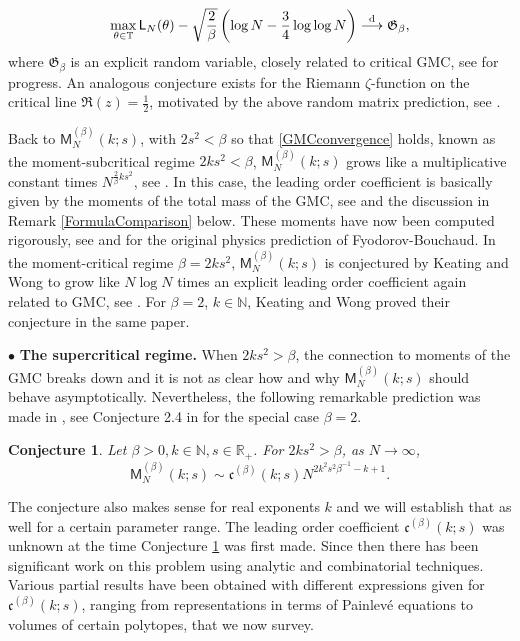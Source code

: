 \documentclass[]{article}
\newtheorem{conj}[thm]{Conjecture}
\begin{document}
\begin{equation}\label{MaxConjecture}
\max_{\theta \in \mathbb{T}}\mathsf{L}_N(\theta)-\sqrt{\frac{2}{\beta}} \left(\log N-\frac{3}{4}\log \log N\right) \overset{\textnormal{d}}{\longrightarrow} \mathfrak{G}_\beta,
\end{equation}
where $\mathfrak{G}_\beta$ is an explicit random variable, closely related to critical GMC, see \cite{ArguinBeliusBourgade,PaquetteZeitouni1,ChhaibiMadauleNajnudel,PaquetteZeitouni2}  for progress. An analogous conjecture exists for the Riemann $\zeta$-function on the critical line $\Re(z)=\frac{1}{2}$, motivated by the above random matrix prediction, see \cite{FyodorovKeating,FyodorovHiaryKeating,NajnudelZeta,ABBRS,Harper,ABR1,ABR2}.



Back to $\mathsf{M}^{(\beta)}_N(k;s)$, with $2s^2<\beta$ so that \eqref{GMCconvergence} holds, known as the moment-subcritical regime $2ks^2<\beta$, $\mathsf{M}^{(\beta)}_N(k;s)$ grows like a multiplicative constant times $N^{\frac{2}{\beta}ks^2}$, see \cite{Remy,KeatingWong,LambertNajnudel}. In this case, the leading order coefficient is basically given by the moments of the total mass of the GMC, see \cite{Remy,KeatingWong,LambertNajnudel} and the discussion in Remark \ref{FormulaComparison} below. These moments have now been computed rigorously, see \cite{Remy,ChhaibiNajnudel} and \cite{FyodorovBouchaud} for the original physics prediction of Fyodorov-Bouchaud. In the moment-critical regime $\beta=2ks^2$, $\mathsf{M}^{(\beta)}_N(k;s)$ is conjectured by Keating and Wong \cite{KeatingWong} to grow like $N\log N$ times an explicit leading order coefficient again related to GMC, see \cite{KeatingWong}. For $\beta=2$, $k\in \mathbb{N}$, Keating and Wong proved their conjecture in the same paper. 

$\bullet$ \textbf{The supercritical regime.} When $2ks^2>\beta$, the connection to moments of the GMC breaks down and it is not as clear how  and why $\mathsf{M}^{(\beta)}_N(k;s)$ should behave asymptotically. Nevertheless, the following remarkable prediction was made in \cite{FyodorovKeating,FyodorovGnutzmannKeating, KeatingWong}, see Conjecture 2.4 in \cite{BaileyKeatingSurvey} for the special case $\beta=2$.

\begin{conj}\label{prediction} 
Let $\beta>0, k\in \mathbb{N}, s\in \mathbb{R}_+$. For $2ks^2>\beta$, as $N \to \infty$,
\begin{equation}
\mathsf{M}^{(\beta)}_N(k;s) \sim \mathfrak{c}^{(\beta)}(k;s) N^{2k^2s^2\beta^{-1}-k+1}.
\end{equation}
\end{conj}
The conjecture also makes sense for real exponents $k$ and we will establish that as well for a certain parameter range. The leading order coefficient $\mathfrak{c}^{(\beta)}(k;s)$ was unknown at the time Conjecture \ref{prediction} was first made.  Since then there has been significant work on this problem using analytic and combinatorial techniques.  Various partial results have been obtained with different expressions given for $\mathfrak{c}^{(\beta)}(k;s)$, ranging from representations in terms of Painlev\'{e} equations to volumes of certain polytopes, that we now survey. 
\end{document}
